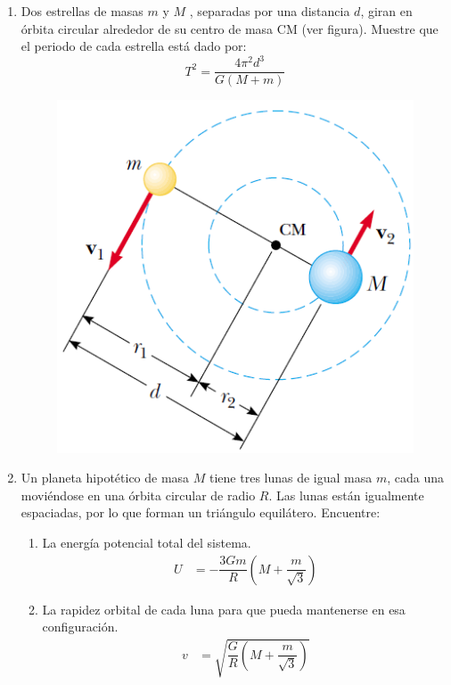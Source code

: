\documentclass[11pt,twocolumn]{article}
\begin{document}
\begin{enumerate}
\item Dos estrellas de masas $m$ y $M$ , separadas por una distancia $d$, giran en órbita circular alrededor de su centro de masa CM (ver figura). Muestre que el periodo de cada estrella está dado por:
\begin{displaymath}
T^{2}=\dfrac{4\pi^{2}d^{3}}{G(M+m)}
\end{displaymath}
\begin{figure}[h]
\centering
\includegraphics[scale=0.5]{fig4}
\end{figure}


\item Un planeta hipotético de masa $M$ tiene tres lunas de igual masa $m$, cada una moviéndose en una órbita circular de radio $R$. Las lunas están igualmente espaciadas, por lo que forman un triángulo equilátero. Encuentre:
\begin{enumerate}
\item La energía potencial total del sistema.
\begin{align*}
U&=-\dfrac{3Gm}{R}\left(M+\dfrac{m}{\sqrt{3}}\right)
\end{align*}
\item La rapidez orbital de cada luna para que pueda mantenerse en esa configuración.
\begin{align*}
v&=\sqrt{\dfrac{G}{R}\left(M+\dfrac{m}{\sqrt{3}}\right)}
\end{align*}
\end{enumerate}




\end{enumerate}
\end{document}
